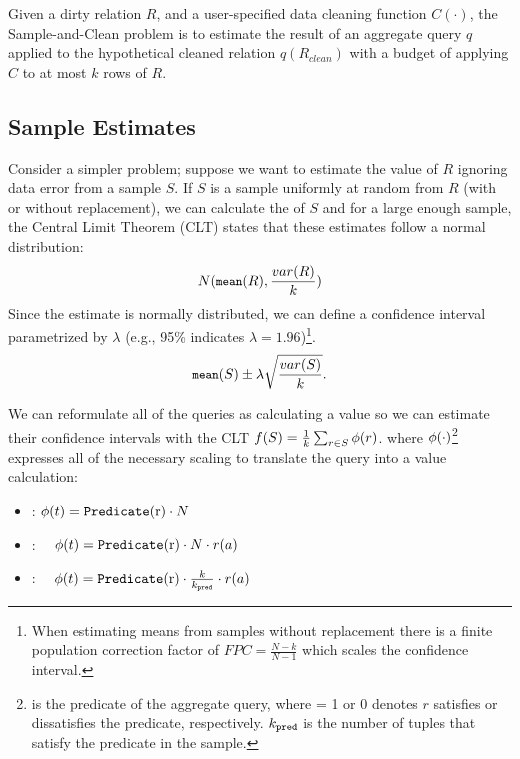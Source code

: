 \vspace{.25em}

\begin{problem}
Given a dirty relation $R$, and a user-specified data cleaning function $C(\cdot)$, the Sample-and-Clean problem is to estimate the result of an aggregate query $q$ applied to the hypothetical cleaned relation $q(R_{clean})$ with a budget of applying $C$ to at most $k$ rows of $R$. 
\end{problem}

\subsection{Sample Estimates}\label{subsec:resultestimation}
Consider a simpler problem; suppose we want to estimate the \mean value of $R$ ignoring data error from a sample $S$.
If $S$ is a sample uniformly at random from $R$ (with or without replacement), we can calculate the \mean of $S$ and for a large enough sample, the Central Limit Theorem (CLT) states that these estimates follow a normal distribution:
\[\small
N(\texttt{mean} (R),\frac{var(R)}{k})
\]
Since the estimate is normally distributed, we can define a confidence interval parametrized by $\lambda$ (e.g., 95\% indicates $\lambda=1.96$)\footnote{\scriptsize When estimating means from samples without replacement there is a finite population correction factor of $FPC=\frac{N-k}{N-1}$ which scales the confidence interval.}.
\begin{equation}\small
\texttt{mean} (S) \pm \lambda \sqrt{\frac{var(S)}{k}}.
\end{equation}

We can reformulate all of the queries as calculating a \mean value so we can estimate their confidence intervals with the CLT 
$
f(S) = \frac{1}{k} \sum_{r \in S} \phi (r)
$.
where $\phi (\cdot)$\footnote{ is the predicate of the aggregate query, where  = 1 or 0 denotes $r$ satisfies or dissatisfies the predicate, respectively. $k_{\texttt{pred} }$ is the number of tuples that satisfy the predicate in the sample.} expresses all of the necessary scaling to translate the query into a \mean value calculation:
\begin{itemize}\vspace{-.5em}
\item \countfunc: $\saqpfunc(t) = \Predicate{r} \cdot N$\vspace{-.5em}
\item \sumfunc: ~\, $\saqpfunc(t) = \Predicate{r} \cdot N \cdot r(a)$\vspace{-.5em}
\item \avgfunc: ~\, $\saqpfunc(t) = \Predicate{r} \cdot \frac{k}{k_{\pred}}  \cdot r(a) $ 
\end{itemize}

